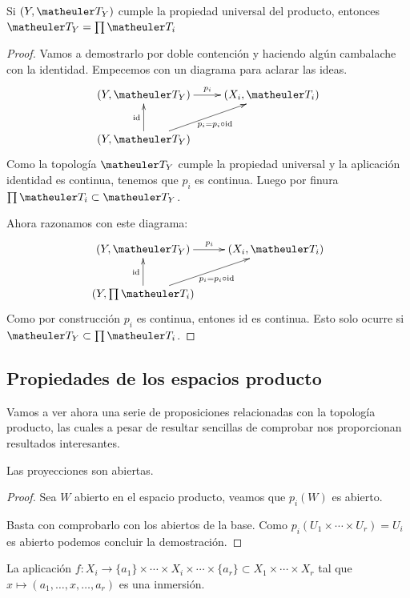 \begin{prop}
	Si $(Y,\T_Y)$ cumple la propiedad universal del producto, entonces $\T_Y = \prod\T_i $
\end{prop}
\begin{proof}
	Vamos a demostrarlo por doble contención y haciendo algún cambalache con la identidad.
	Empecemos con un diagrama para aclarar las ideas.
	\[\xymatrix{
		(Y,\T_Y) \ar[r]^{p_i} & 
		(X_i,\T_i) \\
		(Y,\T_Y) \ar[u]^{\text{id}} \ar[ru]_{p_i = p_i \circ \text{id}} &
	}\]
	Como la topología $\T_Y$ cumple la propiedad universal y la aplicación identidad es continua, tenemos que $p_i$ es continua. Luego por finura $ \prod\T_i \subset \T_Y$.
	
	Ahora razonamos con este diagrama:
	\[\xymatrix{
		(Y,\T_Y) \ar[r]^{p_i} & 
		(X_i,\T_i) \\
		(Y,\prod\T_i) \ar[u]^{\text{id}} \ar[ru]_{p_i = p_i \circ \text{id}} &
	}\]	
	Como por construcción $p_i$ es continua, entones $\text{id}$ es continua. Esto solo ocurre si $\T_Y \subset \prod\T_i$. 	
\end{proof}
\subsection{Propiedades de los espacios producto}

Vamos a ver ahora una serie de proposiciones relacionadas con la topología producto, las cuales a pesar de resultar sencillas de comprobar nos proporcionan resultados interesantes.

\begin{prop}
	Las proyecciones son abiertas.
	
	\begin{proof}
		Sea $W$ abierto en el espacio producto, veamos que $p_i(W)$ es abierto.
		
		Basta con comprobarlo con los abiertos de la base.  Como  $p_i(U_1\times\cdots\times U_r)=U_i$ es abierto podemos concluir la demostración.
	\end{proof}
\end{prop}

\begin{prop}[Inmersiones]
	\label{const_prop_inmersion}
	La aplicación $f : X_i\to\{a_1\}\times\cdots\times X_i\times\cdots\times \{a_r\}\subset X_1\times\cdots\times X_r$ tal que $x\mapsto (a_1,\dots,x,\dots,a_r)$ es una inmersión.
\end{prop}

